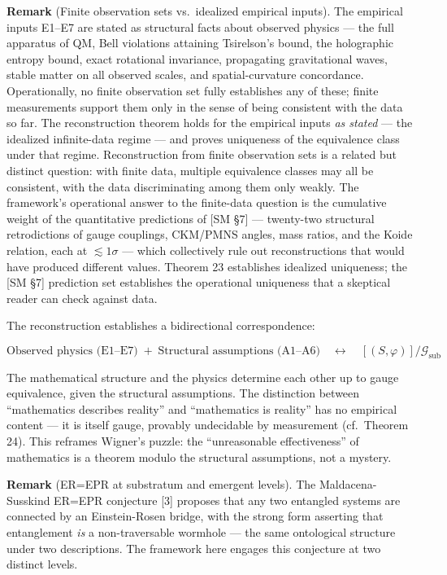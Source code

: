 \documentclass[
]{article}
\begin{document}
\textbf{Remark} (Finite observation sets vs.~idealized empirical
inputs). The empirical inputs E1--E7 are stated as structural facts
about observed physics --- the full apparatus of QM, Bell violations
attaining Tsirelson's bound, the holographic entropy bound, exact
rotational invariance, propagating gravitational waves, stable matter on
all observed scales, and spatial-curvature concordance. Operationally,
no finite observation set fully establishes any of these; finite
measurements support them only in the sense of being consistent with the
data so far. The reconstruction theorem holds for the empirical inputs
\emph{as stated} --- the idealized infinite-data regime --- and proves
uniqueness of the equivalence class under that regime. Reconstruction
from finite observation sets is a related but distinct question: with
finite data, multiple equivalence classes may all be consistent, with
the data discriminating among them only weakly. The framework's
operational answer to the finite-data question is the cumulative weight
of the quantitative predictions of {[}SM §7{]} --- twenty-two structural
retrodictions of gauge couplings, CKM/PMNS angles, mass ratios, and the
Koide relation, each at \(\lesssim 1\sigma\) --- which collectively rule
out reconstructions that would have produced different values. Theorem
23 establishes idealized uniqueness; the {[}SM §7{]} prediction set
establishes the operational uniqueness that a skeptical reader can check
against data.

The reconstruction establishes a bidirectional correspondence:

\[\text{Observed physics (E1–E7)} \; + \; \text{Structural assumptions (A1–A6)} \quad \longleftrightarrow \quad [(S, \varphi)] / \mathcal{G}_{\text{sub}}\]

The mathematical structure and the physics determine each other up to
gauge equivalence, given the structural assumptions. The distinction
between ``mathematics describes reality'' and ``mathematics is reality''
has no empirical content --- it is itself gauge, provably undecidable by
measurement (cf.~Theorem 24). This reframes Wigner's puzzle: the
``unreasonable effectiveness'' of mathematics is a theorem modulo the
structural assumptions, not a mystery.

\textbf{Remark} (ER=EPR at substratum and emergent levels). The
Maldacena-Susskind ER=EPR conjecture {[}3{]} proposes that any two
entangled systems are connected by an Einstein-Rosen bridge, with the
strong form asserting that entanglement \emph{is} a non-traversable
wormhole --- the same ontological structure under two descriptions. The
framework here engages this conjecture at two distinct levels.
\end{document}
